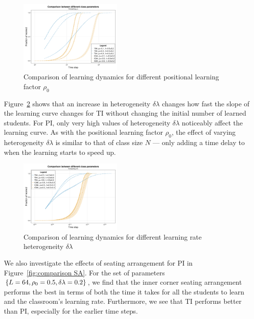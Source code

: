 \documentclass[twocolumn,secnumarabic,amssymb, nobibnotes, aps, prd]{revtex4-2}
\begin{document}
        \begin{figure}[htbp!]
            \centering
            \includegraphics[width=0.45\textwidth]{figures/2D-BPCAIH-analysis/comparison plots/ρ₀.png}
            \caption{Comparison of learning dynamics for different positional learning factor $\rho_0$}
            \label{fig:comparison ρ₀}
        \end{figure}

        Figure~\ref{fig:comparison δλ} shows that an increase in heterogeneity $\delta\lambda$ changes how fast the slope of the learning curve changes for TI without changing the initial number of learned students.
        For PI, only very high values of heterogeneity $\delta\lambda$ noticeably affect the learning curve.
        As with the positional learning factor $\rho_0$, the effect of varying heterogeneity $\delta\lambda$ is similar to that of class size $N$ --- only adding a time delay to when the learning starts to speed up.

        \begin{figure}[htbp!]
            \centering
            \includegraphics[width=0.45\textwidth]{figures/2D-BPCAIH-analysis/comparison plots/δλ.png}
            \caption{Comparison of learning dynamics for different learning rate heterogeneity $\delta\lambda$}
            \label{fig:comparison δλ}
        \end{figure}

        We also investigate the effects of seating arrangement for PI in Figure~\ref{fig:comparison SA}.
        For the set of parameters $\lbrace L=64,\space\rho_0=0.5,\space\delta\lambda=0.2 \rbrace$, we find that the inner corner seating arrangement performs the best in terms of both the time it takes for all the students to learn and the classroom's learning rate.
        Furthermore, we see that TI performs better than PI, especially for the earlier time steps.
\end{document}
